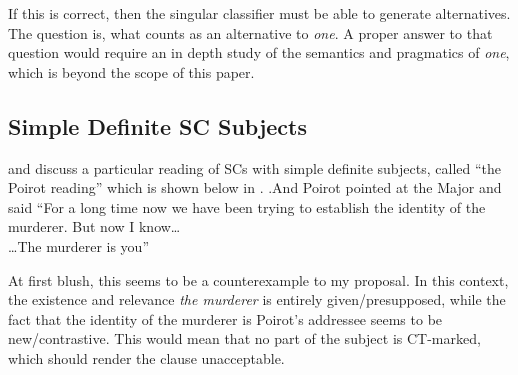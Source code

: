 \documentclass[GPFinal]{subfiles}
\begin{document}
If this is correct, then the singular classifier must be able to generate alternatives.
The question is, what counts as an alternative to \textit{one}.
A proper answer to that question would require an in depth study of the semantics and pragmatics of \textit{one}, which is beyond the scope of this paper.
%
%

\subsection{Simple Definite SC Subjects}

\textcite{heycock2010variability} and \textcite{bejarkahnemuyipour2013agreement} discuss a particular reading of SCs with simple definite subjects, called ``the Poirot reading'' which is shown below in \Next.
\ex.And Poirot pointed at the Major and said ``For a long time now we have been trying to establish the identity of the murderer. But now I know\ldots\\
\ldots The murderer is you''

At first blush, this seems to be a counterexample to my proposal.
In this context, the existence and relevance \textit{the murderer} is entirely given/presupposed, while the fact that the identity of the murderer is Poirot's addressee seems to be new/contrastive. 
This would mean that no part of the subject is CT-marked, which should render the clause unacceptable.
\end{document}
